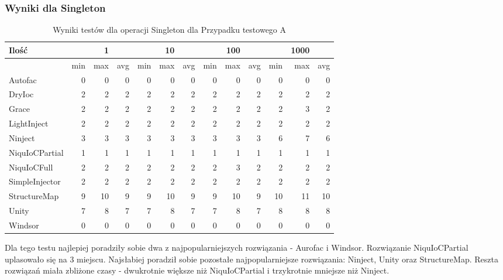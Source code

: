 \documentclass[12pt]{article}
\begin{document}
\subsubsection{Wyniki dla Singleton}
\begin{table}[H]
\captionsetup{belowskip=0pt,aboveskip=0pt}
\begin{center}
\begin{small}
	\begin{tabular}{ | l | r r r | r r r | r r r | r r r | }
    		\hline
Ilość & & 1 & & & 10 & & & 100 & & & 1000 & \\ \hline
 & min & max & avg & min & max & avg & min & max & avg & min & max & avg \\ \hline
Autofac & 0 & 0 & 0 & 0 & 0 & 0 & 0 & 0 & 0 & 0 & 0 & 0 \\ \hline
DryIoc & 2 & 2 & 2 & 2 & 2 & 2 & 2 & 2 & 2 & 2 & 2 & 2 \\ \hline
Grace & 2 & 2 & 2 & 2 & 2 & 2 & 2 & 2 & 2 & 2 & 3 & 2 \\ \hline
LightInject & 2 & 2 & 2 & 2 & 2 & 2 & 2 & 2 & 2 & 2 & 2 & 2 \\ \hline
Ninject & 3 & 3 & 3 & 3 & 3 & 3 & 3 & 3 & 3 & 6 & 7 & 6 \\ \hline
NiquIoCPartial & 1 & 1 & 1 & 1 & 1 & 1 & 1 & 1 & 1 & 1 & 1 & 1 \\ \hline
NiquIoCFull & 2 & 2 & 2 & 2 & 2 & 2 & 2 & 3 & 2 & 2 & 2 & 2 \\ \hline
SimpleInjector & 2 & 2 & 2 & 2 & 2 & 2 & 2 & 2 & 2 & 2 & 2 & 2 \\ \hline
StructureMap & 9 & 10 & 9 & 9 & 10 & 9 & 9 & 10 & 9 & 10 & 11 & 10 \\ \hline
Unity & 7 & 8 & 7 & 7 & 8 & 7 & 7 & 8 & 7 & 8 & 8 & 8 \\ \hline
Windsor & 0 & 0 & 0 & 0 & 0 & 0 & 0 & 0 & 0 & 0 & 0 & 0 \\ \hline
  	\end{tabular}
\end{small}
\end{center}
\caption{Wyniki testów dla operacji Singleton dla Przypadku testowego A}
\label{TestCaseA_Singleton}
\end{table}
Dla tego testu najlepiej poradziły sobie dwa z najpopularniejszych rozwiązania - Aurofac i Windsor. Rozwiązanie NiquIoCPartial uplasowało się na 3 miejscu. Najsłabiej poradził sobie pozostałe najpopularniejsze rozwiązania: Ninject, Unity oraz StructureMap. Reszta rozwiązań miała zbliżone czasy - dwukrotnie większe niż NiquIoCPartial i trzykrotnie mniejsze niż Ninject.
\end{document}
